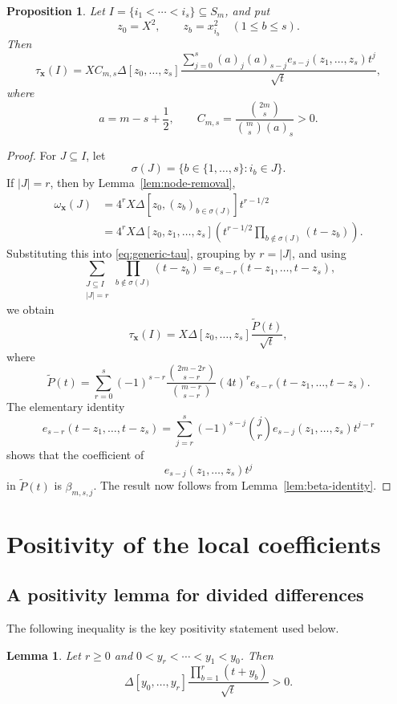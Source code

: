\documentclass[10pt,a4paper]{amsart}
\newtheorem{Lemma}[Theorem]{Lemma}
\newtheorem{Proposition}[Theorem]{Proposition}
\theoremstyle{definition}
\newcommand{\DD}{\Delta}
\begin{document}
\begin{Proposition}\label{prop:generic-local-dd}
Let $I=\{i_1<\cdots<i_s\}\subseteq S_m$,
and put
\[
z_0=X^2,
\qquad
z_b=x_{i_b}^2
\quad(1\le b\le s).
\]
Then
\begin{equation}\label{eq:generic-local-dd}
\tau_{\mathbf x}(I)
=
X C_{m,s}
\DD[z_0,\ldots,z_s]
\frac{
\displaystyle
\sum_{j=0}^s
(a)_j(a)_{s-j}
e_{s-j}(z_1,\ldots,z_s)t^j
}{\sqrt t},
\end{equation}
where
\[
a=m-s+\frac12,
\qquad
C_{m,s}
=
\frac{\binom{2m}{s}}
{\binom{m}{s}(a)_s}>0.
\]
\end{Proposition}

\begin{proof}
For $J\subseteq I$, let
\[
\sigma(J)
=
\{b\in\{1,\ldots,s\}:i_b\in J\}.
\]
If $|J|=r$, then by Lemma~\ref{lem:node-removal},
\[
\begin{aligned}
\omega_{\mathbf x}(J)
&=
4^rX
\DD[z_0,(z_b)_{b\in\sigma(J)}]t^{r-1/2}\\
&=
4^rX
\DD[z_0,z_1,\ldots,z_s]
\left(
t^{r-1/2}
\prod_{b\notin\sigma(J)}(t-z_b)
\right).
\end{aligned}
\]
Substituting this into \eqref{eq:generic-tau}, grouping by $r=|J|$, and
using
\[
\sum_{\substack{J\subseteq I\\|J|=r}}
\prod_{b\notin\sigma(J)}(t-z_b)
=
e_{s-r}(t-z_1,\ldots,t-z_s),
\]
we obtain
\[
\tau_{\mathbf x}(I)
=
X\DD[z_0,\ldots,z_s]
\frac{\widetilde P(t)}{\sqrt t},
\]
where
\[
\widetilde P(t)
=
\sum_{r=0}^s
(-1)^{s-r}
\frac{\binom{2m-2r}{s-r}}
{\binom{m-r}{s-r}}
(4t)^r
e_{s-r}(t-z_1,\ldots,t-z_s).
\]
The elementary identity
\[
e_{s-r}(t-z_1,\ldots,t-z_s)
=
\sum_{j=r}^s
(-1)^{s-j}\binom{j}{r}
e_{s-j}(z_1,\ldots,z_s)t^{j-r}
\]
shows that the coefficient of
\[
e_{s-j}(z_1,\ldots,z_s)t^j
\]
in $\widetilde P(t)$ is $\beta_{m,s,j}$.  The result now follows from
Lemma~\ref{lem:beta-identity}.
\end{proof}

\section{Positivity of the local coefficients}\label{sec:plus}
\subsection{A positivity lemma for divided differences}

The following inequality is the key positivity statement used below.

\begin{Lemma}\label{lem:dd-positive}
Let $r\ge0$ and $0<y_r<\cdots<y_1<y_0$.
Then
\[
\DD[y_0,\ldots,y_r]
\frac{\prod_{b=1}^r(t+y_b)}{\sqrt t}
>0.
\]
\end{Lemma}
\end{document}
